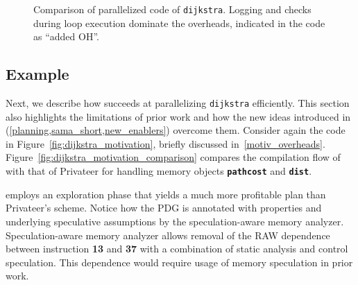\begin{figure}[!h]
\centering
\scriptsize
{}
\caption{Comparison of parallelized code of \texttt{dijkstra}. Logging and
checks during loop execution dominate the overheads, indicated in the code
as ``added OH''.}
\label{fig:dijkstra_motivation_comparison_source_code}
\end{figure}


\subsection{Example}
\label{motiv_example}

Next, we describe how \name succeeds at parallelizing \texttt{dijkstra}
efficiently. This section also highlights the limitations of prior
work and how the new ideas introduced in \name
(\cref{planning,sama_short,new_enablers}) overcome them.
%
Consider again the code in Figure~\ref{fig:dijkstra_motivation},
briefly discussed in~\ref{motiv_overheads}.
%
Figure~\ref{fig:dijkstra_motivation_comparison} compares the
compilation flow of \name with that of Privateer for handling memory objects
\texttt{\textbf{pathcost}} and \texttt{\textbf{dist}}.

\name employs an exploration phase that yields a much more profitable plan
than Privateer's scheme.
Notice how the PDG is annotated with properties and underlying speculative
assumptions by the speculation-aware memory analyzer. Speculation-aware
memory analyzer allows removal of the RAW dependence between instruction
\textbf{13}
and \textbf{37} with a combination of static analysis and control speculation. This
dependence would require usage of memory speculation in prior work.
%

